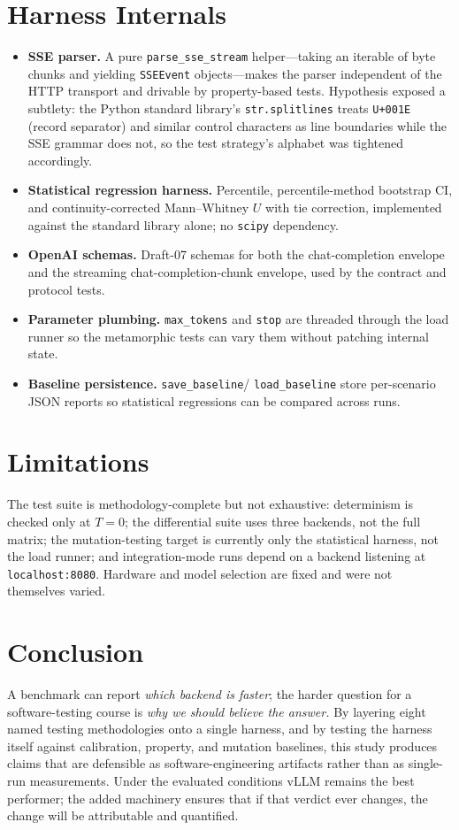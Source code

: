 \documentclass[sigconf,nonacm]{acmart}
\begin{document}
\section{Harness Internals}
\begin{itemize}
  \item \textbf{SSE parser.} A pure
    \texttt{parse\_sse\_stream} helper---taking an iterable of byte
    chunks and yielding \texttt{SSEEvent} objects---makes the parser
    independent of the HTTP transport and drivable by property-based
    tests. Hypothesis exposed a subtlety: the Python standard
    library's \texttt{str.\allowbreak splitlines} treats
    \texttt{U+001E} (record separator) and similar control characters
    as line boundaries while the SSE grammar does not, so the test
    strategy's alphabet was tightened accordingly.
  \item \textbf{Statistical regression harness.} Percentile,
    percentile-method bootstrap CI, and continuity-corrected
    Mann--Whitney $U$ with tie correction, implemented against the
    standard library alone; no \texttt{scipy} dependency.
  \item \textbf{OpenAI schemas.} Draft-07 schemas for both the
    chat-completion envelope and the streaming chat-completion-chunk
    envelope, used by the contract and protocol tests.
  \item \textbf{Parameter plumbing.} \texttt{max\_tokens} and \texttt{stop}
    are threaded through the load runner so the metamorphic tests can
    vary them without patching internal state.
  \item \textbf{Baseline persistence.} \texttt{save\_baseline}/
    \texttt{load\_baseline} store per-scenario JSON reports so statistical
    regressions can be compared across runs.
\end{itemize}

\section{Limitations}
The test suite is methodology-complete but not exhaustive: determinism
is checked only at $T{=}0$; the differential suite uses three backends,
not the full matrix; the mutation-testing target is currently only the
statistical harness, not the load runner; and integration-mode runs
depend on a backend listening at \texttt{localhost:8080}. Hardware and
model selection are fixed and were not themselves varied.

\section{Conclusion}
A benchmark can report \emph{which backend is faster}; the harder
question for a software-testing course is \emph{why we should believe
the answer.} By layering eight named testing methodologies onto a
single harness, and by testing the harness itself against calibration,
property, and mutation baselines, this study produces claims that are
defensible as software-engineering artifacts rather than as single-run
measurements. Under the evaluated conditions
vLLM remains the best performer; the added machinery ensures that if that
verdict ever changes, the change will be attributable and quantified.
\end{document}
